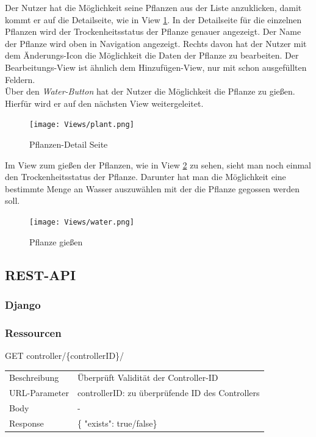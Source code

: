 Der Nutzer hat die Möglichkeit seine Pflanzen aus der Liste anzuklicken, damit kommt er auf die Detailseite, wie in View \ref{plant}. In der Detailseite für die einzelnen Pflanzen wird der Trockenheitsstatus der Pflanze genauer angezeigt. Der Name der Pflanze wird oben in Navigation angezeigt. Rechts davon hat der Nutzer mit dem Änderungs-Icon die Möglichkeit die Daten der Pflanze zu bearbeiten. Der Bearbeitungs-View ist ähnlich dem Hinzufügen-View, nur mit schon ausgefüllten Feldern. \\

Über den \textit{Water-Button} hat der Nutzer die Möglichkeit die Pflanze zu gießen. Hierfür wird er auf den nächsten View weitergeleitet. 

\begin{figure}[H]
    \centering
    \texttt{[image: Views/plant.png]}
    \caption{Pflanzen-Detail Seite}
    \label{plant}
\end{figure}

Im View zum gießen der Pflanzen, wie in View \ref{water} zu sehen, sieht man noch einmal den Trockenheitsstatus der Pflanze. Darunter hat man die Möglichkeit eine bestimmte Menge an Wasser auszuwählen mit der die Pflanze gegossen werden soll. 
\begin{figure}[H]
    \centering
    \texttt{[image: Views/water.png]}
    \caption{Pflanze gießen}
    \label{water}
\end{figure}

    \subsection{REST-API}

        \subsubsection{Django}
        \subsubsection{Ressourcen}
        \newcommand{\tabitem}{~~\llap{\textbullet}~~}
     \begin{minipage}{\textwidth}
             GET controller/\{controllerID\}/ 
        
          \begin{tabularx}{\textwidth}{lX}
                \toprule Beschreibung & Überprüft Validität der Controller-ID \\
                URL-Parameter & controllerID: zu überprüfende ID des Controllers \\
                Body & - \\
                Response & \{ "exists": true/false\}
            \end{tabularx}
    \end{minipage}\\\\
        
